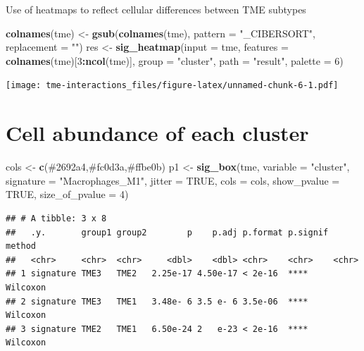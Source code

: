 \documentclass[
  12pt,
]{book}
\newenvironment{Shaded}{\begin{snugshade}}{\end{snugshade}}
\newcommand{\AttributeTok}[1]{\textcolor[rgb]{0.13,0.29,0.53}{#1}}
\newcommand{\ConstantTok}[1]{\textcolor[rgb]{0.56,0.35,0.01}{#1}}
\newcommand{\DecValTok}[1]{\textcolor[rgb]{0.00,0.00,0.81}{#1}}
\newcommand{\FunctionTok}[1]{\textcolor[rgb]{0.13,0.29,0.53}{\textbf{#1}}}
\newcommand{\NormalTok}[1]{#1}
\newcommand{\OtherTok}[1]{\textcolor[rgb]{0.56,0.35,0.01}{#1}}
\newcommand{\SpecialCharTok}[1]{\textcolor[rgb]{0.81,0.36,0.00}{\textbf{#1}}}
\newcommand{\StringTok}[1]{\textcolor[rgb]{0.31,0.60,0.02}{#1}}
\begin{document}
Use of heatmaps to reflect cellular differences between TME subtypes

\begin{Shaded}
\begin{Highlighting}[]
\FunctionTok{colnames}\NormalTok{(tme) }\OtherTok{\textless{}{-}} \FunctionTok{gsub}\NormalTok{(}\FunctionTok{colnames}\NormalTok{(tme), }\AttributeTok{pattern =} \StringTok{"\_CIBERSORT"}\NormalTok{, }\AttributeTok{replacement =} \StringTok{""}\NormalTok{)}
\NormalTok{res }\OtherTok{\textless{}{-}} \FunctionTok{sig\_heatmap}\NormalTok{(}\AttributeTok{input =}\NormalTok{ tme, }\AttributeTok{features =} \FunctionTok{colnames}\NormalTok{(tme)[}\DecValTok{3}\SpecialCharTok{:}\FunctionTok{ncol}\NormalTok{(tme)], }\AttributeTok{group =} \StringTok{"cluster"}\NormalTok{, }\AttributeTok{path =} \StringTok{"result"}\NormalTok{, }\AttributeTok{palette =} \DecValTok{6}\NormalTok{)}
\end{Highlighting}
\end{Shaded}

\texttt{[image: tme-interactions\_files/figure-latex/unnamed-chunk-6-1.pdf]}

\hypertarget{cell-abundance-of-each-cluster}{%
\section{Cell abundance of each cluster}\label{cell-abundance-of-each-cluster}}

\begin{Shaded}
\begin{Highlighting}[]
\NormalTok{cols }\OtherTok{\textless{}{-}} \FunctionTok{c}\NormalTok{(}\StringTok{\textquotesingle{}\#2692a4\textquotesingle{}}\NormalTok{,}\StringTok{\textquotesingle{}\#fc0d3a\textquotesingle{}}\NormalTok{,}\StringTok{\textquotesingle{}\#ffbe0b\textquotesingle{}}\NormalTok{)}
\NormalTok{p1 }\OtherTok{\textless{}{-}} \FunctionTok{sig\_box}\NormalTok{(tme, }\AttributeTok{variable =} \StringTok{"cluster"}\NormalTok{, }\AttributeTok{signature =} \StringTok{"Macrophages\_M1"}\NormalTok{, }\AttributeTok{jitter =} \ConstantTok{TRUE}\NormalTok{,}
              \AttributeTok{cols =}\NormalTok{  cols, }\AttributeTok{show\_pvalue =} \ConstantTok{TRUE}\NormalTok{, }\AttributeTok{size\_of\_pvalue =} \DecValTok{4}\NormalTok{)}
\end{Highlighting}
\end{Shaded}

\begin{verbatim}
## # A tibble: 3 x 8
##   .y.       group1 group2        p    p.adj p.format p.signif method  
##   <chr>     <chr>  <chr>     <dbl>    <dbl> <chr>    <chr>    <chr>   
## 1 signature TME3   TME2   2.25e-17 4.50e-17 < 2e-16  ****     Wilcoxon
## 2 signature TME3   TME1   3.48e- 6 3.5 e- 6 3.5e-06  ****     Wilcoxon
## 3 signature TME2   TME1   6.50e-24 2   e-23 < 2e-16  ****     Wilcoxon
\end{verbatim}
\end{document}
